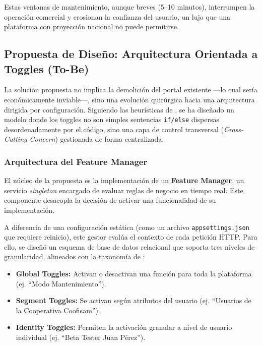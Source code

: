 Estas ventanas de mantenimiento, aunque breves (5--10 minutos), interrumpen la operación comercial y erosionan la confianza del usuario, un lujo que una plataforma con proyección nacional no puede permitirse.



\subsection{Propuesta de Diseño: Arquitectura Orientada a Toggles (To-Be)}

La solución propuesta no implica la demolición del portal existente —lo cual sería económicamente inviable—, sino una evolución quirúrgica hacia una arquitectura dirigida por configuración. Siguiendo las heurísticas de \cite{ajmeri2022heuristics}, se ha diseñado un modelo donde los toggles no son simples sentencias \texttt{if/else} dispersas desordenadamente por el código, sino una capa de control transversal (\textit{Cross-Cutting Concern}) gestionada de forma centralizada.

\subsubsection{Arquitectura del Feature Manager}

El núcleo de la propuesta es la implementación de un \textbf{Feature Manager}, un servicio \textit{singleton} encargado de evaluar reglas de negocio en tiempo real. Este componente desacopla la decisión de activar una funcionalidad de su implementación.

A diferencia de una configuración estática (como un archivo \texttt{appsettings.json} que requiere reinicio), este gestor evalúa el contexto de cada petición HTTP. Para ello, se diseñó un esquema de base de datos relacional que soporta tres niveles de granularidad, alineados con la taxonomía de \cite{chen2025horizon}:

\begin{itemize}
    \item \textbf{Global Toggles:} Activan o desactivan una función para toda la plataforma (ej. ``Modo Mantenimiento'').
    \item \textbf{Segment Toggles:} Se activan según atributos del usuario (ej. ``Usuarios de la Cooperativa Coofisam'').
    \item \textbf{Identity Toggles:} Permiten la activación granular a nivel de usuario individual (ej. ``Beta Tester Juan Pérez'').
\end{itemize}

